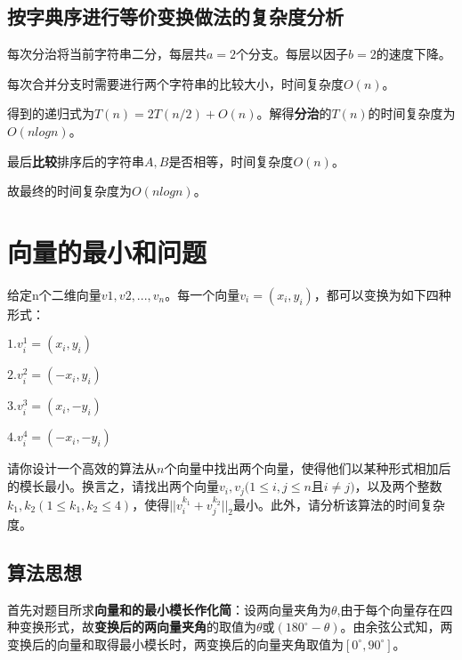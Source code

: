 \documentclass{article}
\begin{document}
\subsection{按字典序进行等价变换做法的复杂度分析}
每次分治将当前字符串二分，每层共$a=2$个分支。每层以因子$b=2$的速度下降。

每次合并分支时需要进行两个字符串的比较大小，时间复杂度$O(n)$。

得到的递归式为$T(n)=2T(n/2)+O(n)$。解得\textbf{分治}的$T(n)$的时间复杂度为$O(nlogn)$。

最后\textbf{比较}排序后的字符串$A,B$是否相等，时间复杂度$O(n)$。

故最终的时间复杂度为$O(nlogn)$。



\section{向量的最小和问题}

给定n个二维向量$v1,v2,...,v_n$。每一个向量$v_i=(x_i,y_i)$，都可以变换为如下四种形式：
	
\noindent
{}
\setlength{\hangindent}{48pt}
\hspace{45pt}$1.v_i^{1}=(x_i,y_i)$
	
\noindent
{}
\setlength{\hangindent}{48pt}
\hspace{45pt}$2.v_i^{2}=(-x_i,y_i)$
	
\noindent
{}
\setlength{\hangindent}{48pt}
\hspace{45pt}$3.v_i^{3}=(x_i,-y_i)$
	
\noindent
{}
\setlength{\hangindent}{48pt}
\hspace{45pt}$4.v_i^{4}=(-x_i,-y_i)$

请你设计一个高效的算法从$n$个向量中找出两个向量，使得他们以某种形式相加后的模长最小。换言之，请找出两个向量$v_i,v_j(1\leq i,j\leq n$且$i\neq j)$，以及两个整数$k_1,k_2(1\leq k_1,k_2\leq 4)$，使得$||v_i^{k_1}+ v_j^{k_2}||_2$最小。此外，请分析该算法的时间复杂度。



\subsection{算法思想}
首先对题目所求\textbf{向量和的最小模长作化简}：设两向量夹角为$\theta$,由于每个向量存在四种变换形式，故\textbf{变换后的两向量夹角}的取值为$\theta$或$(180^{\circ}-\theta )$。由余弦公式知，两变换后的向量和取得最小模长时，两变换后的向量夹角取值为$[0^{\circ},90^{\circ}]$。
\end{document}
